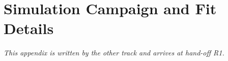 \section{Simulation Campaign and Fit Details}
\label{app:campaign}

\emph{This appendix is written by the other track and arrives at hand-off R1.}

